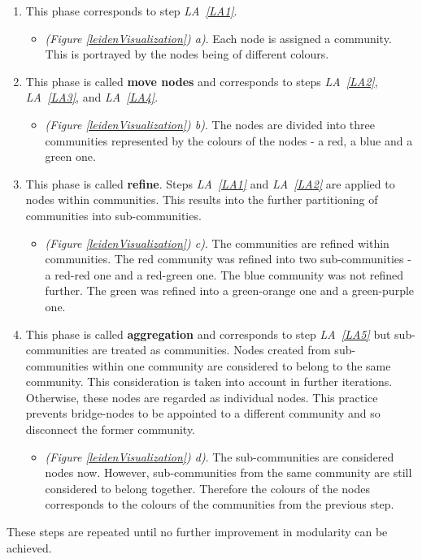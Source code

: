 \begin{enumerate}[label=\alph*)]
  \item This phase corresponds to step \textit{LA~\ref{LA1}}. 
  \begin{itemize}
    \item \textit{(Figure \ref{leidenVisualization}) a)}. Each node is assigned a community. This is portrayed by the nodes being of different colours. \label{leidenAlgorithmPrincipleA}
  \end{itemize} 
    \label{LeAa}
  \item This phase is called \textbf{move nodes} and corresponds to steps \textit{LA~\ref{LA2}}, \textit{LA~\ref{LA3}}, and \textit{LA~\ref{LA4}}. 
  \begin{itemize}
    \item \textit{(Figure \ref{leidenVisualization}) b)}. The nodes are divided into three communities represented by the colours of the nodes - a red, a blue and a green one. \label{leidenAlgorithmPrincipleB}
  \end{itemize} 
    \label{LeAb}
  \item This phase is called \textbf{refine}. Steps \textit{LA~\ref{LA1}} and \textit{LA~\ref{LA2}} are applied to nodes within communities. This results into the further partitioning of communities into sub-communities.
  \begin{itemize}
    \item \textit{(Figure \ref{leidenVisualization}) c)}. The communities are refined within communities. The red community was refined into two sub-communities - a red-red one and a red-green one. The blue community was not refined further. The green was refined into a green-orange one and a green-purple one. 
  \end{itemize} 
    \label{LeAc}
  \item This phase is called \textbf{aggregation} and corresponds to step \textit{LA~\ref{LA5}}  but sub-communities are treated as communities. Nodes created from sub-communities within one community are considered to belong to the same community. This consideration is taken into account in further iterations. Otherwise, these nodes are regarded as individual nodes. This practice prevents bridge-nodes to be appointed to a different community and so disconnect the former community.
  \begin{itemize}
    \item \textit{(Figure \ref{leidenVisualization}) d)}. The sub-communities are considered nodes now. However, sub-communities from the same community are still considered to belong together. Therefore the colours of the nodes corresponds to the colours of the communities from the previous step. 
  \end{itemize} 
    \label{LeAd}
\end{enumerate}
These steps are repeated until no further improvement in modularity can be achieved. 

